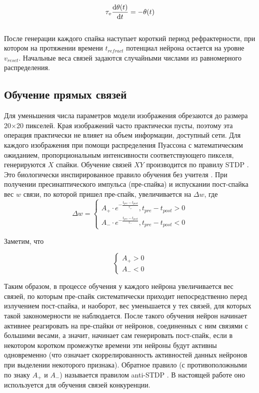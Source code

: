 \documentclass[a4paper]{article}
\begin{document}
\begin{equation}
 \tau_v \dv{\theta(t)}{t} = -\theta(t)
\end{equation}\\

После генерации каждого спайка наступает короткий период рефрактерности, при котором на протяжении времени $t_{refract}$ потенциал нейрона остается на уровне $v_{reset}$. Начальные веса связей задаются случайными числами из равномерного распределения.

\subsection{Обучение прямых связей}
Для уменьшения числа параметров модели изображения обрезаются до размера 20$\times$20 пикселей. Края изображений часто практически пусты, поэтому эта операция практически не влияет на объем информации, доступный сети. Для каждого изображения при помощи распределения Пуассона с математическим ожиданием, пропорциональным интенсивности соответствующего пикселя, генерируются $X$ спайки. Обучение связей $XY$ производится по правилу STDP \cite{STDP}. Это биологически инспирированное правило обучения без учителя \cite{STDP}. При получении пресинаптического импульса (пре-спайка) и испускании пост-спайка вес $w$ связи, по которой пришел пре-спайк, увеличивается на $\Delta w$, где
\begin{equation} 
\Delta w =
 \begin{cases}
 A_+ \cdot e^{- \frac{t_{pre} - t_{post}}{\tau_+}}, t_{pre} - t_{post} > 0\\
 A_- \cdot e^{- \frac{t_{pre} - t_{post}}{\tau_-}}, t_{pre} - t_{post} < 0
 \end{cases}
\end{equation}

Заметим, что

$$
\begin{cases}
 A_{+} > 0\\
 A_{-} < 0
\end{cases}
$$

Таким образом, в процессе обучения у каждого нейрона увеличивается вес связей, по которым пре-спайк систематически приходит непосредственно перед излучением пост-спайка, и наоборот, вес уменьшается у тех связей, для которых такой закономерности не наблюдается. После такого обучения нейрон начинает активнее реагировать на пре-спайки от нейронов, соединенных с ним связями с большими весами, а значит, начинает сам генерировать пост-спайк, если в некотором коротком промежутке времени эти нейроны будут активны одновременно (что означает скоррелированность активностей данных нейронов при выделении некоторого признака). Обратное правило (с противоположными по знаку $A_{+}$ и $A_{-}$) называется правилом anti-STDP \cite{anti-STDP}. В настоящей работе оно используется для обучения связей конкуренции.
\end{document}
